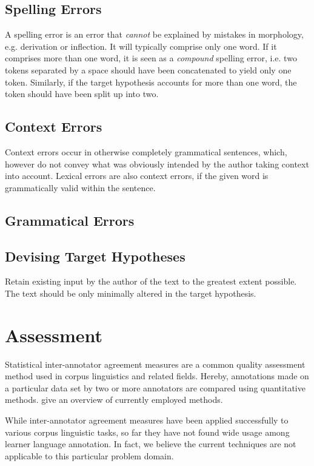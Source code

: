 \documentclass{scrartcl}
\begin{document}
\subsection{Spelling Errors}\label{sec:speling}
A spelling error is an error that \textit{cannot} be explained by mistakes in
morphology, e.g. derivation or inflection. It will typically comprise only one
word. If it comprises more than one word, it is seen as a \textit{compound}
spelling error, i.e. two tokens separated by a space should have been
concatenated to yield only one token. Similarly, if the target hypothesis
accounts for more than one word, the token should have been split up into two.

\subsection{Context Errors}
Context errors occur in otherwise completely grammatical sentences, which, however
do not convey what was obviously intended by the author taking context into
account. Lexical errors are also context errors, if the given word is grammatically
valid within the sentence.

\subsection{Grammatical Errors}

\subsection{Devising Target Hypotheses}
Retain existing input by the author of the text to the greatest extent possible.
The text should be only minimally altered in the target hypothesis.

\section{Assessment}\label{sec:results}

Statistical inter-annotator agreement  measures are a common quality assessment
method used in corpus linguistics and related fields. Hereby, annotations made
on a particular data set by two or more annotators are compared using
quantitative methods.  \cite{ap2008} give an overview of currently employed
methods.

While inter-annotator agreement measures have been applied successfully to
various corpus linguistic tasks, so far they have not found wide usage among
learner language annotation. In fact, we believe the current techniques  are not
applicable to this particular problem domain.
\end{document}
